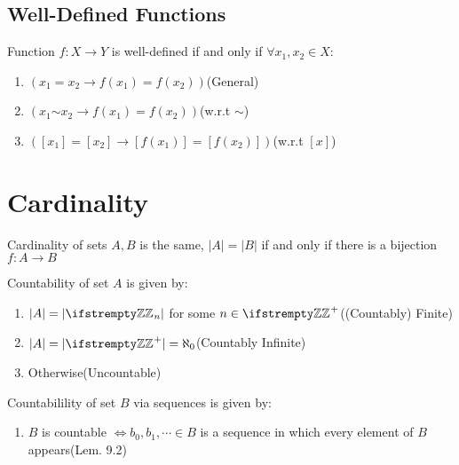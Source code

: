\documentclass[12pt, a4paper]{article}
\begin{document}
\begin{multicols*}{3}
\subsection{Well-Defined Functions}
Function $f: X \rightarrow Y$ is well-defined if and only if $\forall x_1, x_2 \in X$:
\begin{enumerate}[\roman*.]
  \item $(x_1=x_2\rightarrow f(x_1)=f(x_2))$\hfill(General) 
  \item $(x_1\mathord{\sim}x_2\rightarrow f(x_1)=f(x_2))$\hfill(w.r.t $\sim$) 
  \item $([x_1]=[x_2]\rightarrow [f(x_1)]=[f(x_2)])$\hfill(w.r.t $[x]$) 
\end{enumerate}

\colbreak
\section{Cardinality}
Cardinality of sets $A, B$ is the same, $|A|=|B|$ if and only if there is a bijection $f: A\rightarrow B$

Countability of set $A$ is given by:
\begin{enumerate}[\roman*.]
  \item $|A|=|\ZZ_n|$ for some $n\in\ZZ^+$\hfill((Countably) Finite)
  \item $|A|=|\ZZ^+|=\aleph_0$\hfill(Countably Infinite)
  \item Otherwise\hfill(Uncountable)
\end{enumerate}

Countabilility of set $B$ via sequences is given by:
\begin{enumerate}[\roman*.]
  \item $B$ is countable $\iff b_0,b_1,\cdots \in B$ is a sequence in which every element of $B$ appears\hfill(Lem. 9.2)
\end{enumerate}


\end{multicols*}
\end{document}
